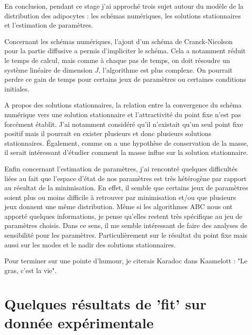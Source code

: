 \documentclass[a4paper,fleqn,leqno]{article}
\begin{document}
En conclusion, pendant ce stage j'ai approché trois sujet autour du modèle de la distribution des adipocytes : les schémas numériques, les solutions stationnaires et l'estimation de paramètres.

Concernant les schémas numériques, l'ajout d'un schéma de Cranck-Nicolson pour la partie diffusive a permis d'impliciter le schéma. Cela a notamment réduit le temps de calcul, mais comme à chaque pas de temps, on doit résoudre un système linéaire de dimension $J$, l'algorithme est plus complexe. On pourrait perdre ce gain de temps pour certains jeux de paramètres ou certaines conditions initiales.

A propos des solutions stationnaires, la relation entre la convergence du schéma numérique vers une solution stationnaire et l'attractivité du point fixe n'est pas forcément établit. J'ai notamment considéré qu'il n'existait qu'un seul point fixe positif mais il pourrait en exister plusieurs et donc plusieurs solutions stationnaires. Également, comme on a une hypothèse de conservation de la masse, il serait intéressant d'étudier comment la masse influe sur la solution stationnaire.

Enfin concernant l'estimation de paramètres, j'ai rencontré quelques difficultés liées au fait que l'espace d'état de nos paramètres est très hétérogène par rapport au résultat de la minimisation. En effet, il semble que certains jeux de paramètres soient plus ou moins difficile à retrouver par minimisation et/ou que plusieurs jeux donnent une même distribution. Même si les algorithmes ABC nous ont apporté quelques informations, je pense qu'elles restent très spécifique au jeu de paramètres choisis. Dans ce sens, il me semble intéressant de faire des analyses de sensibilité pour les paramètres. Particulièrement sur le résultat du point fixe mais aussi sur les modes et le nadir des solutions stationnaires.

Pour terminer sur une pointe d'humour, je citerais Karadoc dans Kaamelott : "Le gras, c'est la vie".


\newpage

\appendix

\section{Quelques résultats de 'fit' sur donnée expérimentale}\label{appendix:A}
\end{document}
